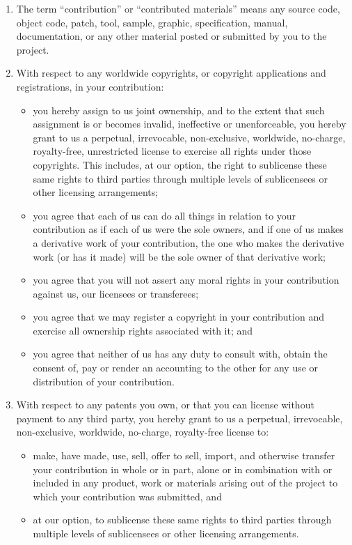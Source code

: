 \documentclass{article}
\begin{document}
\begin{enumerate}
\item The term ``contribution'' or ``contributed materials'' means any
  source code, object code, patch, tool, sample, graphic,
  specification, manual, documentation, or any other material posted
  or submitted by you to the project.

\item With respect to any worldwide copyrights, or copyright
  applications and registrations, in your contribution:

\begin{itemize}
\item you hereby assign to us joint ownership, and to the extent that
  such assignment is or becomes invalid, ineffective or unenforceable,
  you hereby grant to us a perpetual, irrevocable, non-exclusive,
  worldwide, no-charge, royalty-free, unrestricted license to exercise
  all rights under those copyrights. This includes, at our option, the
  right to sublicense these same rights to third parties through
  multiple levels of sublicensees or other licensing arrangements;
\item you agree that each of us can do all things in relation to your
  contribution as if each of us were the sole owners, and if one of us
  makes a derivative work of your contribution, the one who makes the
  derivative work (or has it made) will be the sole owner of that
  derivative work;
\item you agree that you will not assert any moral rights in your
  contribution against us, our licensees or transferees;
\item you agree that we may register a copyright in your contribution
  and exercise all ownership rights associated with it; and
\item you agree that neither of us has any duty to consult with,
  obtain the consent of, pay or render an accounting to the other for
  any use or distribution of your contribution.
\end{itemize}

\item With respect to any patents you own, or that you can license
  without payment to any third party, you hereby grant to us a
  perpetual, irrevocable, non-exclusive, worldwide, no-charge,
  royalty-free license to:
\begin{itemize}
\item make, have made, use, sell, offer to sell, import, and otherwise
  transfer your contribution in whole or in part, alone or in
  combination with or included in any product, work or materials
  arising out of the project to which your contribution was submitted,
  and
\item at our option, to sublicense these same rights to third parties
  through multiple levels of sublicensees or other licensing
  arrangements.
\end{itemize}


\end{enumerate}
\end{document}
